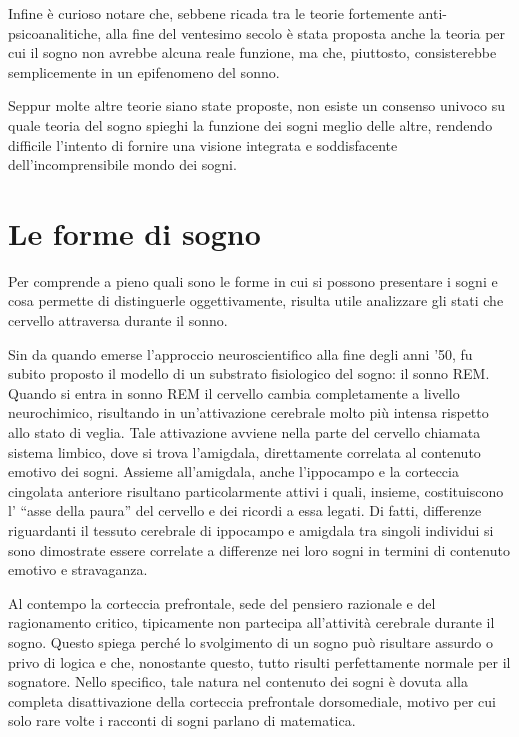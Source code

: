 Infine è curioso notare che, sebbene ricada tra le teorie fortemente anti-psicoanalitiche, alla fine del
ventesimo secolo è stata proposta anche la teoria per cui il sogno non avrebbe alcuna reale funzione, ma che,
piuttosto, consisterebbe semplicemente in un epifenomeno del sonno.

Seppur molte altre teorie siano state proposte, non esiste un consenso univoco su quale teoria del sogno
spieghi la funzione dei sogni meglio delle altre, rendendo difficile l'intento di fornire una visione integrata e
soddisfacente dell'incomprensibile mondo dei sogni.

\section{Le forme di sogno}

Per comprende a pieno quali sono le forme in cui si possono presentare i sogni e cosa permette di distinguerle
oggettivamente, risulta utile analizzare gli stati che cervello attraversa durante il sonno.

Sin da quando emerse l'approccio neuroscientifico alla fine degli anni '50, fu subito proposto il modello di un
substrato fisiologico del sogno: il sonno REM\@.
Quando si entra in sonno REM il cervello cambia completamente a livello neurochimico, risultando in un'attivazione
cerebrale molto più intensa rispetto allo stato di veglia.
Tale attivazione avviene nella parte del cervello chiamata sistema limbico, dove si trova
l'amigdala, direttamente correlata al contenuto emotivo dei sogni.
Assieme all'amigdala, anche l'ippocampo e la corteccia cingolata anteriore risultano particolarmente attivi
i quali, insieme, costituiscono l' ``asse della paura'' del cervello e dei ricordi a essa legati.
Di fatti, differenze riguardanti il tessuto cerebrale di ippocampo e amigdala tra singoli individui si sono dimostrate
essere correlate a differenze nei loro sogni in termini di contenuto emotivo e stravaganza.

Al contempo la corteccia prefrontale, sede del pensiero razionale e del ragionamento critico, tipicamente non
partecipa all'attività cerebrale durante il sogno.
Questo spiega perché lo svolgimento di un sogno può risultare assurdo o privo di logica e che, nonostante questo,
tutto risulti perfettamente normale per il sognatore.
Nello specifico, tale natura nel contenuto dei sogni è dovuta alla completa disattivazione della
corteccia prefrontale dorsomediale, motivo per cui solo rare volte i racconti di sogni parlano di matematica.

